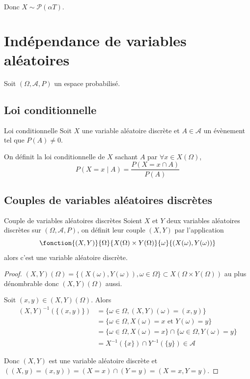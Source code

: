 Donc $X \sim \mathcal P(\alpha T)$. 

\section{Indépendance de variables aléatoires }

Soit $(\Omega, \mathcal A, P)$ un espace probabilisé.

\subsection{Loi conditionnelle}

\begin{definition}{Loi conditionnelle}{}
    Soit $X$ une variable aléatoire discrète et $A \in \mathcal A$ un évènement tel que $P(A) \neq 0$.

    On définit la loi conditionnelle de $X$ sachant $A$ par $\forall x \in X(\Omega)$,
    $$ P(X = x \mid A) = \frac{P(X = x \cap A)}{P(A)}$$
\end{definition}

\subsection{Couples de variables aléatoires discrètes }

\begin{theoreme}{Couple de variables aléatoires discrètes}{}
    Soient $X$ et $Y$ deux variables aléatoires discrètes sur $(\Omega, \mathcal A, P)$, on définit 
    leur couple $(X, Y)$ par l'application 
    $$\fonction{(X, Y)}{\Omega}{X(\Omega) \times Y(\Omega)}{\omega}{(X(\omega), Y(\omega))}$$
    alors c'est une variable aléatoire discrète.
\end{theoreme}

\begin{proof}
    $(X, Y)(\Omega) = \{(X(\omega), Y(\omega)), \omega \in \Omega \} \subset X(\Omega \times Y(\Omega))$ au plus dénombrable 
    donc $(X, Y)(\Omega)$ aussi. 

    Soit $(x, y) \in (X, Y)(\Omega)$. Alors 
    \begin{align}
        (X, Y)^{-1}(\{(x, y)\}) & = \{\omega \in \Omega, (X, Y)(\omega) = (x, y)\} \\
        & = \{\omega \in \Omega, X(\omega) = x \text{ et } Y(\omega) = y\} \\
        & = \{\omega \in \Omega, X(\omega) = x\} \cap \{\omega \in \Omega, Y(\omega) = y\} \\
        & = X^{-1}(\{x\}) \cap Y^{-1}(\{y\}) \in \mathcal A
    \end{align} 

    Donc $(X, Y)$ est une variable aléatoire discrète et $((X, y) = (x, y)) = (X = x) \cap (Y = y) = (X = x, Y = y)$.
\end{proof}

